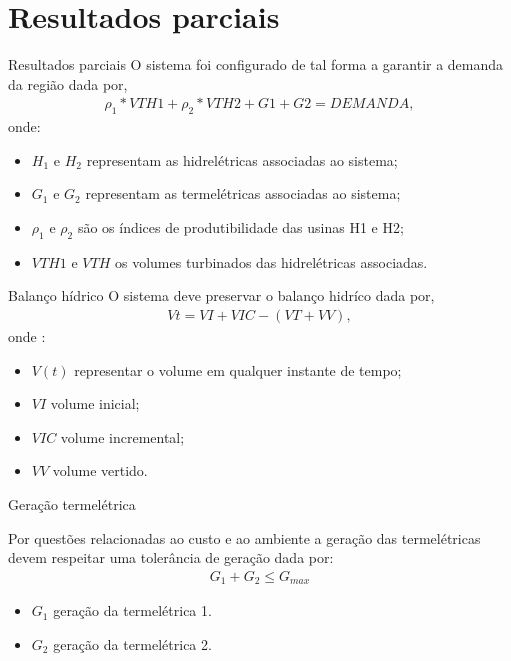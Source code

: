 \documentclass[12pt]{beamer}
\begin{document}
\section{Resultados parciais}
\begin{frame}{Resultados parciais}
O sistema foi configurado de tal forma a garantir a demanda da regi\~ao dada por,
\begin{align*}
{\rho}_1*VTH1 + {\rho}_2*VTH2 + G1 + G2 = DEMANDA,
\end{align*}
onde:
\begin{itemize}
	\item $H_1$ e $H_2$ representam as hidrel\'etricas associadas ao sistema;
	\item $G_1$ e $G_2$ representam as termel\'etricas associadas ao sistema;
	\item $\rho_1$ e $\rho_2$ s\~ao os \'indices de produtibilidade das usinas H1 e H2;
	\item $VTH1$ e $VTH$  os volumes turbinados das hidrel\'etricas associadas.
\end{itemize}
\end{frame}
\begin{frame}{Balan\c co h\'idrico}
O sistema deve preservar o balan\c co hidr\'ico dada por,
{\setlength{\belowdisplayskip}{-4pt}
\begin{align*}
  \displaystyle Vt = VI + VIC - \left( VT + VV \right), 
\end{align*}}
onde : 
\begin{itemize}
	\item $V(t)$ representar o volume em qualquer instante de tempo;
	\item $VI$  volume inicial;
	\item $VIC$ volume incremental;
	\item $VV$ volume vertido.
\end{itemize}
\end{frame}
\begin{frame}{Gera\c c\~ao termel\'etrica}
\begin{justify}	
Por quest\~oes relacionadas ao custo e ao ambiente a gera\c c\~ao das termel\'etricas devem respeitar uma toler\^ancia de
gera\c c\~ao dada por:
\begin{align*}
	G_1 + G_2 \leq G_{max}
\end{align*}
\begin{itemize}
	\item $G_1$ gera\c c\~ao da termel\'etrica 1.
	\item $G_2$ gera\c c\~ao da termel\'etrica 2.
\end{itemize}
\end{justify}	
\end{frame}
\end{document}
